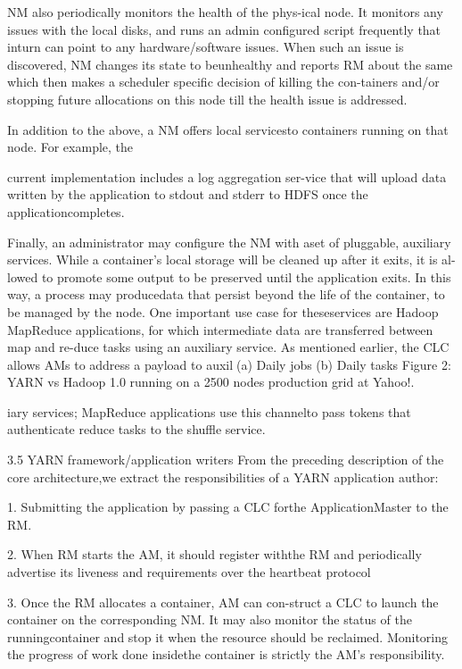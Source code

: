 NM also periodically monitors the health of the phys-ical node. It monitors any issues with the local disks,
and runs an admin configured script frequently that inturn can point to any hardware/software issues. When
such an issue is discovered, NM changes its state to beunhealthy and reports RM about the same which then
makes a scheduler specific decision of killing the con-tainers and/or stopping future allocations on this node
till the health issue is addressed.

In addition to the above, a NM offers local servicesto containers running on that node. For example, the

current implementation includes a log aggregation ser-vice that will upload data written by the application to
stdout and stderr to HDFS once the applicationcompletes.

Finally, an administrator may configure the NM with aset of pluggable, auxiliary services. While a container's
local storage will be cleaned up after it exits, it is al-lowed to promote some output to be preserved until the
application exits. In this way, a process may producedata that persist beyond the life of the container, to be
managed by the node. One important use case for theseservices are Hadoop MapReduce applications, for which
intermediate data are transferred between map and re-duce tasks using an auxiliary service. As mentioned earlier, the CLC allows AMs to address a payload to auxil(a) Daily jobs
(b) Daily tasks
Figure 2: YARN vs Hadoop 1.0 running on a 2500 nodes production grid at Yahoo!.

iary services; MapReduce applications use this channelto pass tokens that authenticate reduce tasks to the shuffle service.

3.5 YARN framework/application writers
From the preceding description of the core architecture,we extract the responsibilities of a YARN application author:

1. Submitting the application by passing a CLC forthe ApplicationMaster to the RM.

2. When RM starts the AM, it should register withthe RM and periodically advertise its liveness and requirements over the heartbeat protocol

3. Once the RM allocates a container, AM can con-struct a CLC to launch the container on the corresponding NM. It may also monitor the status of the runningcontainer and stop it when the resource should be reclaimed. Monitoring the progress of work done insidethe container is strictly the AM's responsibility.

